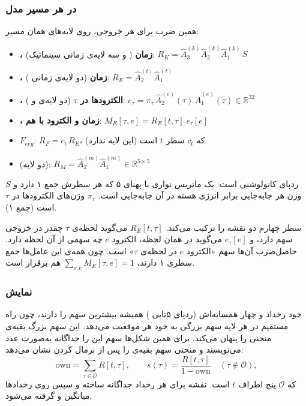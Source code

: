 \subsubsection*{ در هر مسیر مدل}
همین ضرب برای هر خروجی، روی لایه‌های همان مسیر:
\begin{itemize}
\item \textbf{، زمان} ( و سه لایه‌ی زمانی سینماتیک): $R_K=\hat A^{(k)}_3\hat A^{(k)}_2\hat A^{(k)}_1\,S$
\item \textbf{، زمان} (دو لایه‌ی زمانی ): $R_E=\hat A^{(t)}_2\hat A^{(t)}_1$
\item \textbf{، الکترودها در  $\tau$} (دو لایه‌ی  و ): $e_\tau=\pi_\tau\,\hat A^{(e)}_2(\tau)\,\hat A^{(e)}_1(\tau)\in\mathbb{R}^{32}$
\item \textbf{، زمان و الکترود با هم}: $M_E[\tau,e]=R_E[t,\tau]\;e_\tau[e]$
\item \textbf{$F_{eeg}$}: $R_F=c_t\,R_E$، که $c_t$ سطر $t$  است (این لایه  ندارد)
\item \textbf{} (دو لایه): $R_M=\hat A^{(m)}_2\hat A^{(m)}_1\in\mathbb{R}^{5\times5}$
\end{itemize}
$S$ ردپای  کانولوشنی  است: یک ماتریس نواری با پهنای ۵ که هر سطرش جمع ۱ دارد و وزن هر جابه‌جایی برابر انرژی هسته در آن جابه‌جایی است. $\pi_\tau$ وزن‌های  الکترودها در  $\tau$ است (جمع ۱).

سطر چهارم دو نقشه را ترکیب می‌کند. $R_E[t,\tau]$ می‌گوید لحظه‌ی $\tau$ چقدر در خروجی سهم دارد، و $e_\tau[e]$ می‌گوید در همان لحظه، الکترود $e$ چه سهمی از آن لحظه دارد. حاصل‌ضرب آن‌ها سهم «الکترود $e$ در لحظه‌ی $\tau$» است. چون همه‌ی این عامل‌ها جمع سطری ۱ دارند، $\sum_{\tau,e}M_E[\tau,e]=1$ هم برقرار است.

\subsubsection*{نمایش}
 خود رخداد و چهار همسایه‌اش (ردپای ۵تایی ) همیشه بیشترین سهم را دارند، چون راه مستقیم  در هر لایه سهم بزرگی به خود هر موقعیت می‌دهد. این سهم بزرگ بقیه‌ی منحنی را پنهان می‌کند. برای همین شکل‌ها سهم این  را جداگانه به‌صورت عدد می‌نویسند و منحنی سهم بقیه‌ی  را پس از نرمال کردن نشان می‌دهد:
\begin{equation}
\mathrm{own}=\sum_{\tau\in\mathcal{O}}R[t,\tau],\qquad s(\tau)=\frac{R[t,\tau]}{1-\mathrm{own}}\quad(\tau\notin\mathcal{O}),
\end{equation}
که $\mathcal{O}$ پنج  اطراف $t$ است. نقشه برای هر رخداد جداگانه ساخته و سپس روی رخدادها میانگین و  گرفته می‌شود.

